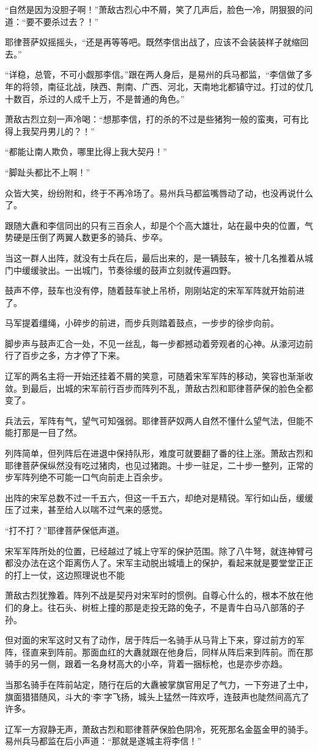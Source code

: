 “自然是因为没胆子啊！”萧敌古烈心中不屑，笑了几声后，脸色一冷，阴狠狠的问道：“要不要杀过去？！”

耶律菩萨奴摇摇头，“还是再等等吧。既然李信出战了，应该不会装装样子就缩回去。”

“详稳，总管，不可小觑那李信。”跟在两人身后，是易州的兵马都监，“李信做了多年的将领，南征北战，陕西、荆南、广西、河北，天南地北都镇守过。打过的仗几十数百，杀过的人成千上万，不是普通的角色。”

萧敌古烈立刻一声冷喝：“想那李信，打的杀的不过是些猪狗一般的蛮夷，可有比得上我契丹男儿的？！”

“都能让南人欺负，哪里比得上我大契丹！”

“脚趾头都比不上啊！”

众皆大笑，纷纷附和，终于不再冷场了。易州兵马都监嘴唇动了动，也没再说什么了。

跟随大纛和李信同出的只有三百余人，却是个个高大雄壮，站在最中央的位置，气势硬是压倒了两翼人数更多的骑兵、步卒。

当这一群人出阵，就没有士兵在后，最后出来的，是一辆鼓车，被十几名推着从城门中缓缓驶出。一出城门，节奏徐缓的鼓声立刻就传遍四野。

鼓声不停，鼓车也没有停，随着鼓车驶上吊桥，刚刚站定的宋军军阵就开始前进了。

马军提着缰绳，小碎步的前进，而步兵则踏着鼓点，一步步的徐步向前。

脚步声与鼓声汇合一处，不见一丝乱，每一步都撼动着旁观者的心神。从濠河边前行了百步之多，方才停了下来。

辽军的两名主将一开始还挂着不屑的笑意，可随着宋军军阵的移动，笑容也渐渐收敛。到最后，出城的宋军前行百步而阵列不乱，萧敌古烈和耶律菩萨保的脸色全都变了。

兵法云，军阵有气，望气可知强弱。耶律菩萨奴两人自然不懂什么望气法，但能不能打那是一目了然。

列阵简单，但列阵后在进退中保持队形，难度可就要翻了番的往上涨。萧敌古烈和耶律菩萨保纵然没有吃过猪肉，也见过猪跑。十步一驻足，二十步一整列，正常的步军阵列绝不可能一口气向前走上百余步。

出阵的宋军总数不过一千五六，但这一千五六，却绝对是精锐。军行如山岳，缓缓压了过来，甚至给人以喘不过气来的感觉。

“打不打？”耶律菩萨保低声道。

宋军军阵所处的位置，已经越过了城上守军的保护范围。除了八牛弩，就连神臂弓都没办法在这个距离伤人了。宋军主动脱出城墙上的保护，看起来就是要堂堂正正的打上一仗，这边照理说也不能

萧敌古烈犹豫着。阵列不战是契丹对宋军时的惯例。自尊心什么的，根本不放在他们的身上。往石头、树桩上撞的那是走投无路的兔子，不是青牛白马八部落的子孙。

但对面的宋军这时又有了动作，居于阵后一名骑手从马背上下来，穿过前方的军阵，径直来到阵前。那面血红的大纛就跟在他身后，同样从阵后来到阵前。而在那骑手的另一侧，跟着一名身材高大的小卒，背着一捆标枪，也是亦步亦趋。

当那名骑手在阵前站定，随行在后的大纛被掌旗官用足了气力，一下夯进了土中，旗面猎猎随风，斗大的‘李’字飞扬，城头上猛然一阵欢呼，连鼓声也陡然间高亢了许多。

辽军一方寂静无声，萧敌古烈和耶律菩萨保脸色阴冷，死死那名金盔金甲的骑手。易州兵马都监在后小声道：“那就是遂城主将李信！”

